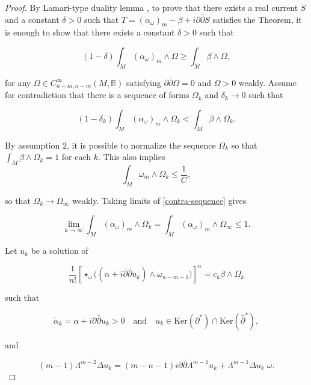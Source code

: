 \documentclass[11pt,letterpaper]{amsart}
\newcommand{\pbp}{\partial \bar{\partial}}
\newcommand{\Ker}{\mbox{Ker}}
\numberwithin{equation}{section}
\begin{document}
\begin{proof}

By Lamari-type duality lemma \cite{Lamari99, DP25}, to prove that there exists a real current $S$ and a constant $\delta>0$ such that $T = (\alpha_{\omega})_{m} - \beta + i \pbp S$ satisfies the Theorem, it is enough to show that there exists a constant $\delta>0$ such that 

$$(1-\delta)\int_{M}(\alpha_{\omega})_{m}\wedge\Omega\geq\int_{M}\beta\wedge\Omega,$$

  \noindent for any $\Omega \in C^{\infty}_{n-m,n-m}(M, \mathbb R)$ satisfying $\pbp \Omega = 0$ and $\Omega>0$ weakly. Assume for contradiction that there is a sequence of forms $\Omega_k$ and $\delta_k \to 0$ such that 

  
  \begin{equation}\label{contra-sequence}
       (1-\delta_k)\int_{M}(\alpha_{\omega})_{m}\wedge\Omega_k<\int_{M}\beta\wedge\Omega_k.
  \end{equation}
 
  By assumption $2$, it is possible to normalize the sequence $\Omega_k$ so that $\int_{M}\beta\wedge\Omega_k = 1$ for each $k$. This also implies $$\int_M \omega_m \wedge \Omega_k \le \frac{1}{C},$$

  \noindent so that $\Omega_k \to \Omega_{\infty}$ weakly. Taking limits of \eqref{contra-sequence} gives
  
  $$\lim_{k \to \infty} \int_{M} (\alpha_{\omega})_{m} \wedge \Omega_{k} = \int_{M} (\alpha_{\omega})_{m} \wedge \Omega_{\infty} \leq 1.$$
  
  Let $u_k$ be a solution of 

  \begin{equation}
      \frac{1}{n!} \left[ \star_\omega \Big( (\alpha + i\partial\bar{\partial}u_k) \wedge \omega_{n-m-1} \Big) \right]^n = c_k \beta \wedge \Omega_k
  \end{equation}

  \noindent such that 

  \begin{equation}
      \tilde{\alpha}_k = \alpha + i\partial\bar{\partial}u_k > 0 \quad \text{and} \quad u_k \in \Ker(\partial^*) \cap \Ker(\bar{\partial}^*),
  \end{equation}

  \noindent and

  \begin{equation}\label{generalIC1}
      (m-1)\Lambda^{m-2} \Delta u_k = (m-n-1)i \pbp \Lambda^{m-1}  u_k +  \Lambda^{m-1} \Delta u_k \;\omega.
  \end{equation}   


\end{proof}
\end{document}
